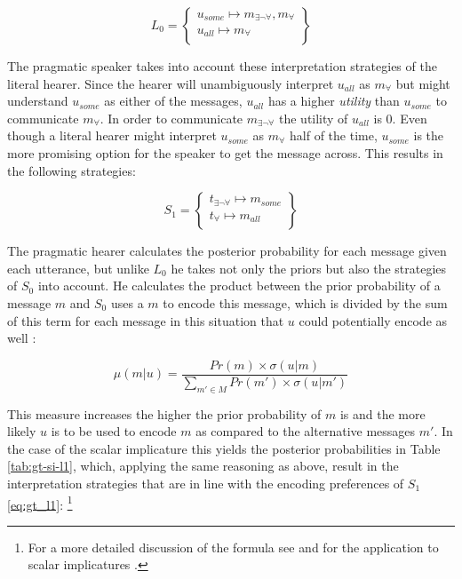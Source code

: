 \begin{equation}\label{eq:l0}
 L_0 = \begin{Bmatrix} u_{some} \mapsto m_{\exists\neg\forall},m_{\forall}   \\
        u_{all} \mapsto m_{\forall}\\
       \end{Bmatrix}
\end{equation}

The pragmatic speaker takes into account these interpretation strategies of the literal hearer. Since the hearer will unambiguously interpret $u_{all}$ as $m_{\forall}$ but might understand $u_{some}$ as either of the messages, $u_{all}$ has a higher \textit{utility} than $u_{some}$ to communicate $m_{\forall}$. In order to communicate $m_{\exists\neg\forall}$ the utility of $u_{all}$ is 0. Even though a literal hearer might interpret $u_{some}$ as $m_{\forall}$ half of the time, $u_{some}$ is the more promising option for the speaker to get the message across. This results in the following strategies:

\begin{equation}
 S_1 = \begin{Bmatrix} t_{\exists\neg\forall} \mapsto m_{some}\\
        t_{\forall} \mapsto m_{all}\\
       \end{Bmatrix}
\end{equation}

The pragmatic hearer calculates the posterior probability for each message given each utterance, but unlike $L_0$ he takes not only the priors but also the strategies of $S_0$ into account. He calculates the product between the prior probability of a message $m$ and $S_0$ uses a $m$ to encode this message, which is divided by the sum of this term for each message in this situation that $u$ could potentially encode as well \citep[27]{franke2009}:

\begin{equation}
\displaystyle \mu(m|u) = \frac{Pr(m) \times \sigma (u|m)}{\sum_{m'\in M} Pr(m') \times \sigma(u|m')} %
\end{equation}

This measure increases the higher the prior probability of $m$ is and the more likely $u$ is to be used to encode $m$ as compared to the alternative messages $m'$. In the case of the scalar implicature this yields the posterior probabilities in Table \ref{tab:gt-si-l1}, which, applying the same reasoning as above, result in the interpretation strategies that are in line with the encoding preferences of $S_1$ \ref{eq:gt_l1}:%
%
\footnote{For a more detailed discussion of the formula see \citep[26--27]{franke2009} and for the application to scalar implicatures \citep[60]{franke2009}.}\afterfn%
%

